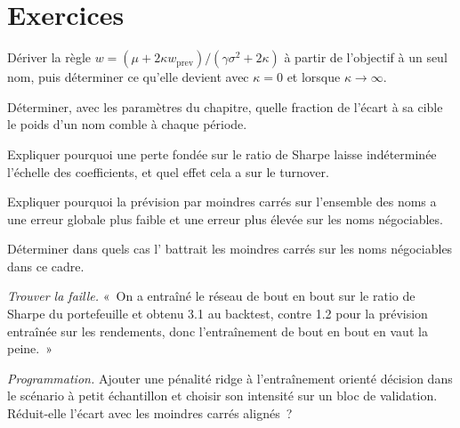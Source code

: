 \section{Exercices}

\begin{exercise}[$\star$]\label{exo:ml:from-prediction-to-portfolio:1}
Dériver la règle $w = (\mu + 2\kappa w_{\mathrm{prev}})/(\gamma\sigma^2 + 2\kappa)$ à partir de l'objectif à un seul nom, puis déterminer
ce qu'elle devient avec $\kappa = 0$ et lorsque $\kappa\to\infty$.
\end{exercise}

\begin{exercise}[$\star$]\label{exo:ml:from-prediction-to-portfolio:2}
Déterminer, avec les paramètres du chapitre, quelle fraction de l'écart à sa cible le poids d'un nom comble à chaque période.
\end{exercise}

\begin{exercise}[$\star$]\label{exo:ml:from-prediction-to-portfolio:3}
Expliquer pourquoi une perte fondée sur le ratio de Sharpe laisse indéterminée l'échelle des coefficients, et quel effet cela a sur le turnover.
\end{exercise}

\begin{exercise}[$\star\star$]\label{exo:ml:from-prediction-to-portfolio:4}
Expliquer pourquoi la prévision par moindres carrés sur l'ensemble des noms a une erreur globale plus faible et une erreur plus élevée sur les noms négociables.
\end{exercise}

\begin{exercise}[$\star\star$]\label{exo:ml:from-prediction-to-portfolio:5}
Déterminer dans quels cas l' battrait les moindres carrés sur les noms négociables dans ce cadre.
\end{exercise}

\begin{exercise}[$\star\star$]\label{exo:ml:from-prediction-to-portfolio:6}
\emph{Trouver la faille.} «~On a entraîné le réseau de bout en bout sur le ratio de Sharpe du portefeuille et obtenu 3.1 au backtest, contre
1.2 pour la prévision entraînée sur les rendements, donc l'entraînement de bout en bout en vaut la peine.~»
\end{exercise}

\begin{exercise}[$\star\star\star$]\label{exo:ml:from-prediction-to-portfolio:7}
\emph{Programmation.} Ajouter une pénalité ridge à l'entraînement orienté décision dans le scénario à petit échantillon et choisir son intensité sur un
bloc de validation. Réduit-elle l'écart avec les moindres carrés alignés~?
\end{exercise}

